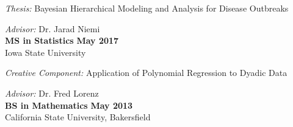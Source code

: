 \documentclass{article}
\renewcommand{\section}[1]{\pagebreak[3]%
    \hyphenpenalty=10000%
    \vspace{1.3\baselineskip}%
    \phantomsection\addcontentsline{toc}{section}{#1}%
    \noindent\llap{\scshape\smash{\parbox[t]{\marginparwidth}{\raggedright #1}}}%
    \vspace{-\baselineskip}\par}
\newenvironment{innerlist}[1][\enskip\textbullet]%
        {\begin{itemize}[#1,leftmargin=*,parsep=0pt,itemsep=0pt,topsep=0pt,partopsep=0pt]}
        {\end{itemize}}
\begin{document}
\textit{Thesis:} Bayesian Hierarchical Modeling and Analysis for Disease Outbreaks

\textit{Advisor:} Dr. Jarad Niemi\\

{\textbf{MS in Statistics}} \hfill {\textbf{May 2017}} \\
Iowa State University

\textit{Creative Component:} Application of Polynomial Regression to Dyadic Data

\textit{Advisor:} Dr. Fred Lorenz \\

{\textbf{BS in Mathematics}} \hfill {\textbf{May 2013}} \\
California State University, Bakersfield





% 
% 
\end{document}
